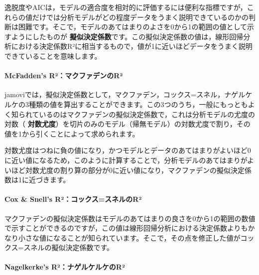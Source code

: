 \documentclass[
  12pt,
  a5jpaper,
  lualatex, ja=standard]{bxjsbook}
\renewcommand{\emph}[1]{\textbf{\color{emph} #1}}
\begin{document}
逸脱度やAICは，モデルの適合度を相対的に評価するには便利な指標ですが，これらの値だけでは分析モデルがどの程度データをうまく説明できているのかの判断は困難です。そこで，モデルのあてはまりのよさを0から1の範囲の値として示すようにしたものが\emph{擬似決定係数}です。この擬似決定係数の値は，線形回帰分析における決定係数R²に相当するもので，値が1に近いほどデータをうまく説明できていることを意味します。

\hypertarget{mcfaddens-ruxb2ux30deux30afux30d5ux30a1ux30c7ux30f3ux306eruxb2}{%
\paragraph*{McFadden's R²：マクファデンのR²}\label{mcfaddens-ruxb2ux30deux30afux30d5ux30a1ux30c7ux30f3ux306eruxb2}}

jamoviでは，擬似決定係数として，マクファデン，コックス=スネル，ナゲルケルケの3種類の値を算出することができます。この3つのうち，一般にもっともよく知られているのはマクファデンの擬似決定係数で，これは分析モデルの尤度の対数（\emph{対数尤度}）を切片のみのモデル（帰無モデル）の対数尤度で割り，その値を1から引くことによって求められます。

対数尤度はつねに負の値になり，かつモデルとデータのあてはまりがよいほど0に近い値になるため，このように計算することで，分析モデルのあてはまりがよいほど対数尤度の割り算の部分が0に近い値になり，マクファデンの擬似決定係数は1に近づきます。

\hypertarget{cox-snells-ruxb2ux30b3ux30c3ux30afux30b9ux30b9ux30cdux30ebux306eruxb2}{%
\paragraph*{Cox \& Snell's R²：コックス=スネルのR²}\label{cox-snells-ruxb2ux30b3ux30c3ux30afux30b9ux30b9ux30cdux30ebux306eruxb2}}

マクファデンの擬似決定係数はモデルのあてはまりの良さを0から1の範囲の数値で示すことができるのですが，この値は線形回帰分析における決定係数よりもかなり小さな値になることが知られています。そこで，その点を修正した値がコックス=スネルの擬似決定係数です。

\hypertarget{nagelkerkes-ruxb2ux30caux30b2ux30ebux30b1ux30ebux30b1ux306eruxb2}{%
\paragraph*{Nagelkerke's R²：ナゲルケルケのR²}\label{nagelkerkes-ruxb2ux30caux30b2ux30ebux30b1ux30ebux30b1ux306eruxb2}}
\end{document}

